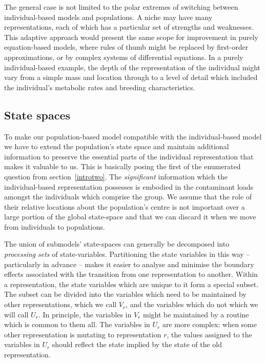 The general case is not limited to the polar extremes of switching between
individual-based models and populations. A niche may have many
representations, each of which has a particular set of strengths and
weaknesses. This adaptive approach would present the same scope for
improvement in purely equation-based models, where rules of thumb might be
replaced by first-order approximations, or by complex systems of differential
equations. In a purely individual-based example, the depth of the
representation of the individual might vary from a simple mass and location
through to a level of detail which included the individual's metabolic rates
and breeding characteristics.

\subsection{State spaces}

To make our population-based model compatible with the individual-based model
we have to extend the population's state space and maintain additional
information to preserve the essential parts of the individual representation
that makes it valuable to us. This is basically posing the first of the
enumerated question from section~\ref{introtwo}. The {\em{significant}\/}
information which the individual-based representation possesses is embodied in
the contaminant loads amongst the individuals which comprise the group. We
assume that the role of their relative locations about the population's centre
is not important over a large portion of the global state-space and that we
can discard it when we move from individuals to populations.

The union of submodels' state-spaces can generally be decomposed into
{\em{processing sets}\/} of state-variables. Partitioning the state variables
in this way -- particularly in advance -- makes it easier to analyse and
minimise the boundary effects associated with the transition from one
representation to another. Within a representation, the state variables which
are unique to it form a special subset. The subset can be divided into the
variables which need to be maintained by other representations, which we call
$V_r^{}$, and the variables which do not which we will call $U_r^{}$. In
principle, the variables in $V_r$ might be maintained by a routine which is
common to them all. The variables in $U_r$ are more complex: when some other
representation is mutating to representation $r$, the values assigned to the
variables in $U_r$ should reflect the state implied by the state of the old
representation.

